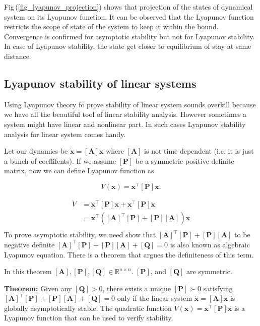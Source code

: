 \documentclass{article}
\begin{document}
Fig\,(\ref{fig_lyapunov_projection}) shows that projection of the states of dynamical system on its Lyapunov function. It can be observed that the Lyapunov function restricts the scope of state of the system to keep it within the bound. Convergence is confirmed for asymptotic stability but not for Lyapunov stability. In case of Lyapunov stability, the state get closer to equilibrium of stay at same distance.

\subsection{Lyapunov stability of linear systems}
Using Lyapunov theory fo prove stability of linear system sounds overkill because we have all the beautiful tool of linear stability analysis. However sometimes a system might have linear and nonlinear part. In such cases Lyapunov stability analysis for linear system comes handy.

Let our dynamics be $\dot{\bm{x}}=[\bm{A}]\bm{x}$ where $[\bm{A}]$ is not time dependent (i.e. it is just a bunch of coeffifents). If we assume $[\bm{P}]$ be a symmetric positive definite matrix, now we can define Lyapunov function as

$$
V(\bm{x})=\bm{x}^{\intercal}[\bm{P}]\bm{x}.
$$

\begin{equation*}
\begin{split}
  \dot{V}&=\dot{\bm{x}}^{\intercal}[\bm{P}]\bm{x}+\bm{x}^{\intercal}[\bm{P}]\dot{\bm{x}}\\
         &=\bm{x}^{\intercal}([\bm{A}]^{\intercal}[\bm{P}]+[\bm{P}][\bm{A}])\bm{x}\\
\end{split}
\end{equation*}
To prove asymptotic stability, we need show that $[\bm{A}]^{\intercal}[\bm{P}]+[\bm{P}][\bm{A}]$ to be negative definite $[\bm{A}]^{\intercal}[\bm{P}]+[\bm{P}][\bm{A}]+[\bm{Q}]=0$ is also known as algebraic Lyapunov equation. There is a theorem that argues the definiteness of this term.

In this theorem $[\bm{A}],[\bm{P}],[\bm{Q}]\in\mathbb{R}^{n\times n}$. $[\bm{P}]$, and $[\bm{Q}]$ are symmetric.

\textbf{Theorem:} Given any $[\bm{Q}]>0$, there exists a unique $[\bm{P}]\succ0$ satisfying $[\bm{A}]^{\intercal}[\bm{P}]+[\bm{P}][\bm{A}]+[\bm{Q}]=0$ only if the linear system $\dot{\bm{x}}=[\bm{A}]\bm{x}$ is globally asymptotically stable. The quadratic function $V(\bm{x})=\bm{x}^\intercal[\bm{P}]\bm{x}$ is a Lyapunov function that can be used to verify stability.
\end{document}
